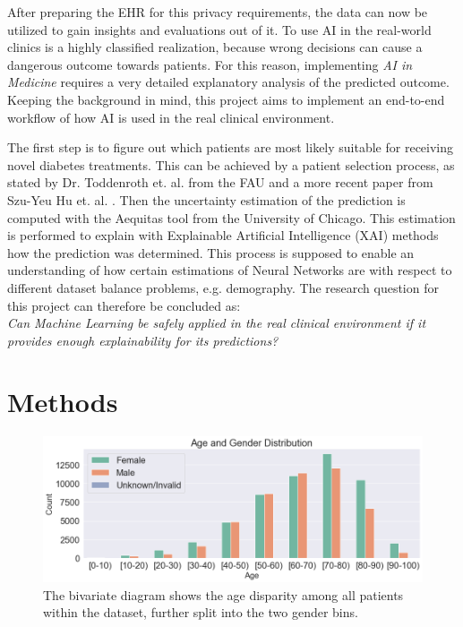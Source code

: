 \documentclass[journal]{IEEEtran}
\begin{document}
After preparing the EHR for this privacy requirements, the data can now be utilized to gain insights and evaluations out of it. To use AI in the real-world clinics is a highly classified realization, because wrong decisions can cause a dangerous outcome towards patients. For this reason, implementing \textit{AI in Medicine} requires a very detailed explanatory analysis of the predicted outcome. Keeping the background in mind, this project aims to implement an end-to-end workflow of how AI is used in the real clinical environment. 

The first step is to figure out which patients are most likely suitable for receiving novel diabetes treatments. This can be achieved by a patient selection process, as stated by Dr. Toddenroth et. al. from the FAU \cite{cite4} and a more recent paper from Szu-Yeu Hu et. al. \cite{cite3}. Then the uncertainty estimation of the prediction is computed with the Aequitas tool from the University of Chicago. This estimation is performed to explain with Explainable Artificial Intelligence (XAI) methods how the prediction was determined. This process is supposed to enable an understanding of how certain estimations of Neural Networks are with respect to different dataset balance problems, e.g. demography. The research question for this project can therefore be concluded as: \\

\textit{Can Machine Learning be safely applied in the real clinical environment if it provides enough explainability for its predictions?} 

\section{Methods}
\begin{figure}
	\centering
	\includegraphics[width=1\linewidth]{../imgs/age_new}
	\caption{The bivariate diagram shows the age disparity among all patients within the dataset, further split into the two gender bins.}
	\label{fig:age}
\end{figure}
\end{document}
